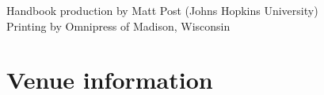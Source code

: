 \documentclass[twoside,makeidx]{book}
\begin{document}
\fancyfoot[C]{}

\fancyfoot[C]{\thepage}

\thispagestyle{empty}
\mbox{}

\vfill
\noindent Handbook production by Matt Post (Johns Hopkins University) \\  
Printing by Omnipress of Madison, Wisconsin
\newpage

\frontmatter

\clearpage%
\setheaders{}{}

\clearpage
%
\clearpage%
\setheaders{}{}

\setcounter{tocdepth}{2}
\tableofcontents
\mainmatter
\pagestyle{fancy}

%
\clearpage




\chapter{Venue information}

\clearpage

\clearpage

\cleardoublepage
{}
\printindex

\cleardoublepage

\cleardoublepage


\end{document}
